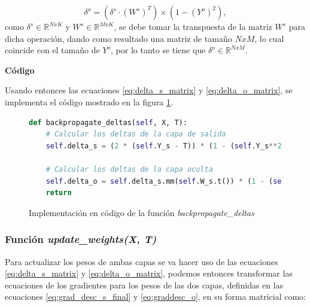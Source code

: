 \documentclass{article}
\begin{document}
\begin{equation}
    \delta^{o} = (\delta^{s} \cdot (W^{s})^{T}) \times (1 - (Y^{o})^{2}), \label{eq:delta_o_matrix}
\end{equation}
\noindent
como $\delta^s \in \mathbb{R}^{NxK}$ y $W^s \in \mathbb{R}^{MxK}$, se debe tomar la transpuesta de la matriz $W^s$ para dicha operación, dando como resultado una matriz de tamaño $NxM$, lo cual coincide con el tamaño de $Y^o$, por lo tanto se tiene que $\delta^o \in \mathbb{R}^{NxM}$.
\medskip

\noindent
\textbf{Código}
\medskip

Usando entonces las ecuaciones \ref{eq:delta_s_matrix} y \ref{eq:delta_o_matrix}, se implementa el código mostrado en la figura \ref{code:deltas}.

\begin{figure}[htbp]
\begin{lstlisting}[language=Python, texcl=true]
def backpropagate_deltas(self, X, T):
    # Calcular los deltas de la capa de salida
    self.delta_s = (2 * (self.Y_s - T)) * (1 - (self.Y_s**2))
    
    # Calcular los deltas de la capa oculta
    self.delta_o = self.delta_s.mm(self.W_s.t()) * (1 - (self.Y_o**2))
    return\end{lstlisting}
    \caption{Implementación en código de la función \textit{backpropagate\_deltas}}
    \label{code:deltas}
\end{figure}


\subsubsection{Función \textit{update\_weights(X, T)}}

Para actualizar los pesos de ambas capas se va hacer uso de las ecuaciones \ref{eq:delta_s_matrix} y \ref{eq:delta_o_matrix}, podemos entonces transformar las ecuaciones de los gradientes para los pesos de las dos capas, definidas en las ecuaciones \ref{eq:grad_desc_s_final} y \ref{eq:graddesc_o}, en su forma matricial como:
\end{document}
